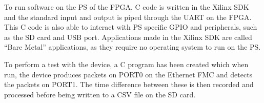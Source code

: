 To run software on the PS of the FPGA, C code is written in the Xilinx SDK and the standard input and output is 
piped through the UART on the FPGA. This C code is also able to interact with PS specific GPIO and peripherals, such 
as the SD card and USB port.  Applications made in the Xilinx SDK are called “Bare Metal” applications, as they 
require no operating system to run on the PS.

To perform a test with the device, a C program has been created which when run, the device produces packets on PORT0 
on the Ethernet FMC and detects the packets on PORT1. The time difference between these is then recorded and 
processed before being written to a CSV file on the SD card. 

